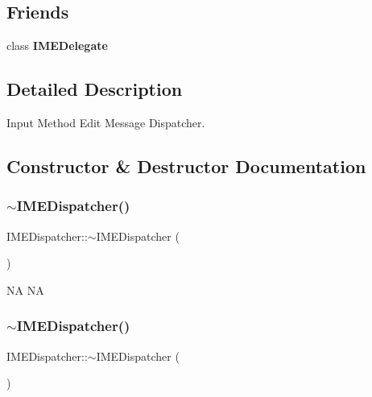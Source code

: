 \subsection*{Friends}
\begin{DoxyCompactItemize}
\item 
\mbox{\label{classIMEDispatcher_ab6e694ddc3c7b1f2161800fca11a2690}} 
class {\bfseries I\+M\+E\+Delegate}
\end{DoxyCompactItemize}


\subsection{Detailed Description}
Input Method Edit Message Dispatcher. 

\subsection{Constructor \& Destructor Documentation}
\mbox{\label{classIMEDispatcher_a1324cb0b92e74c3c83a2b684732abe91}} 
\subsubsection{\texorpdfstring{$\sim$\+I\+M\+E\+Dispatcher()}{~IMEDispatcher()}\hspace{0.1cm}{\footnotesize\ttfamily [1/2]}}
{\footnotesize\ttfamily I\+M\+E\+Dispatcher\+::$\sim$\+I\+M\+E\+Dispatcher (\begin{DoxyParamCaption}{ }\end{DoxyParamCaption})}

NA  NA \mbox{\label{classIMEDispatcher_a1324cb0b92e74c3c83a2b684732abe91}} 
\subsubsection{\texorpdfstring{$\sim$\+I\+M\+E\+Dispatcher()}{~IMEDispatcher()}\hspace{0.1cm}{\footnotesize\ttfamily [2/2]}}
{\footnotesize\ttfamily I\+M\+E\+Dispatcher\+::$\sim$\+I\+M\+E\+Dispatcher (\begin{DoxyParamCaption}{ }\end{DoxyParamCaption})}


